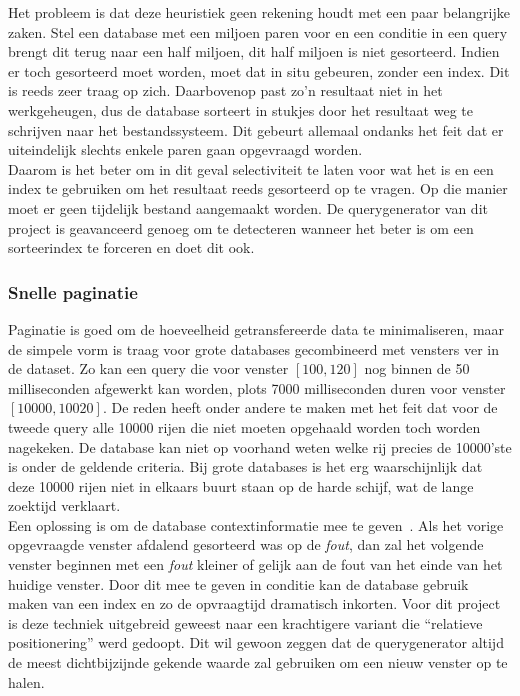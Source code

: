 Het probleem is dat deze heuristiek geen rekening houdt met een paar belangrijke zaken. Stel een database met een miljoen paren voor en een conditie in een query brengt dit terug naar een half miljoen, dit half miljoen is niet gesorteerd. Indien er toch gesorteerd moet worden, moet dat in situ gebeuren, zonder een index. Dit is reeds zeer traag op zich. Daarbovenop past zo'n resultaat niet in het werkgeheugen, dus de database sorteert in stukjes door het resultaat weg te schrijven naar het bestandssysteem. Dit gebeurt allemaal ondanks het feit dat er uiteindelijk slechts enkele paren gaan opgevraagd worden.\\

Daarom is het beter om in dit geval selectiviteit te laten voor wat het is en een index te gebruiken om het resultaat reeds gesorteerd op te vragen. Op die manier moet er geen tijdelijk bestand aangemaakt worden. De querygenerator van dit project is geavanceerd genoeg om te detecteren wanneer het beter is om een sorteerindex te forceren en doet dit ook.

\subsubsection{Snelle paginatie}
Paginatie is goed om de hoeveelheid getransfereerde data te minimaliseren, maar de simpele vorm is traag voor grote databases gecombineerd met vensters ver in de dataset. Zo kan een query die voor venster $[100, 120]$ nog binnen de 50 milliseconden afgewerkt kan worden, plots 7000 milliseconden duren voor venster $[10000, 10020]$. De reden heeft onder andere te maken met het feit dat voor de tweede query alle 10000 rijen die niet moeten opgehaald worden toch worden nagekeken. De database kan niet op voorhand weten welke rij precies de 10000'ste is onder de geldende criteria. Bij grote databases is het erg waarschijnlijk dat deze 10000 rijen niet in elkaars buurt staan op de harde schijf, wat de lange zoektijd verklaart.\\

Een oplossing is om de database contextinformatie mee te geven~\cite{sqlfastpag}. Als het vorige opgevraagde venster afdalend gesorteerd was op de \emph{fout}, dan zal het volgende venster beginnen met een \emph{fout} kleiner of gelijk aan de fout van het einde van het huidige venster. Door dit mee te geven in conditie kan de database gebruik maken van een index en zo de opvraagtijd dramatisch inkorten. Voor dit project is deze techniek uitgebreid geweest naar een krachtigere variant die ``relatieve positionering'' werd gedoopt. Dit wil gewoon zeggen dat de querygenerator altijd de meest dichtbijzijnde gekende waarde zal gebruiken om een nieuw venster op te halen.

